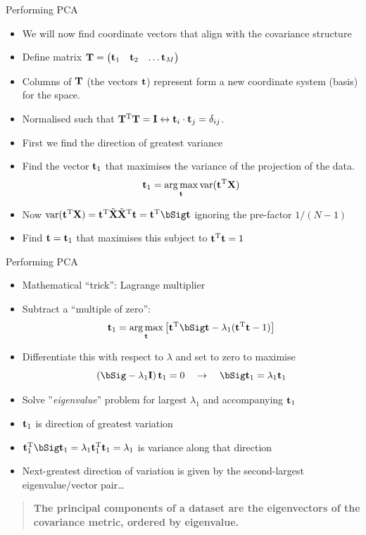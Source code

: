 \documentclass{beamer}
\begin{document}
\begin{frame}{Performing PCA}
  \begin{itemize}
    \item We will now find coordinate vectors that align with the covariance structure
    \item Define matrix $\mathbf{T}=\begin{pmatrix}\mathbf{t}_1 & \mathbf{t}_2 & \dots \mathbf{t}_M\end{pmatrix}$
    \item Columns of $\mathbf{T}$ (the vectors $\mathbf{t}$) represent  form a new coordinate system (basis) for the space.
    \item Normalised such that $\mathbf{T}^{\mathrm{T}}\mathbf{T}=\mathbf{I}\leftrightarrow \mathbf{t}_i\cdot\mathbf{t}_j = \delta_{ij}$.
    \item First we find the direction of greatest variance
    \item Find the vector $\mathbf{t}_1$ that maximises the variance of the projection of the data.
    \begin{equation*}
      \mathbf{t}_1 =  \operatorname*{arg\,max}_{\mathbf{t}}\operatorname*{var}(\mathbf{t}^{\mathrm{T}}\mathbf{X})
    \end{equation*}
    \item Now $\var(\bt^\rT\bX)=\bt^\rT\tilde\bX\tilde\bX^\rT\bt = \bt^\rT\bSig\bt$ ignoring the pre-factor $1/(N-1)$
    \item Find $\mathbf{t}=\mathbf{t}_1$ that maximises this subject to $\mathbf{t}^{\mathrm{T}}\mathbf{t}=1$
  \end{itemize}
\end{frame}

\begin{frame}{Performing PCA}
  \begin{itemize}
    \item Mathematical ``trick'': Lagrange multiplier
    \item Subtract a ``multiple of zero'':
      \begin{equation}
        \bt_1 = \argmax _\bt \left[\bt^\rT\bSig\bt -\lambda_1(\bt^\rT\bt-1)\right]
      \end{equation}
    \item Differentiate this with respect to $\lambda$ and set to zero to maximise
      \begin{equation}
        \left(\bSig-\lambda_1\bI\right)\bt_1 = 0\quad\rightarrow\quad \bSig\bt_1 = \lambda_1\bt_1
      \end{equation}
    \item Solve ''\textit{eigenvalue}'' problem for largest $\lambda_1$ and accompanying $\mathbf{t}_1$
    \item $\mathbf{t}_1$ is direction of greatest variation
    \item $\bt_1^\rT\bSig\bt_1=\lambda_1\bt_1^\rT\bt_1 = \lambda_1$ is variance along that direction 
    \item Next-greatest direction of variation is given by the second-largest eigenvalue/vector pair\dots
  \end{itemize}
  \begin{quote}
    \textbf{The principal components of a dataset are the eigenvectors of the covariance metric, ordered by eigenvalue.}
  \end{quote}
\end{frame}
\end{document}

